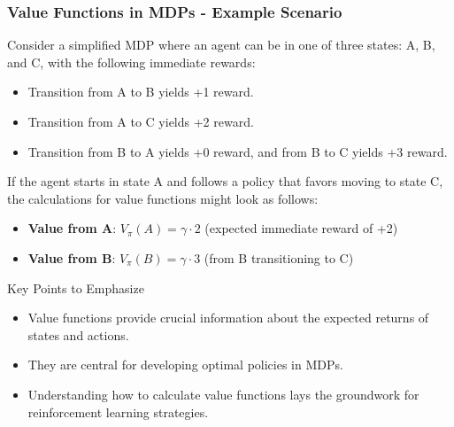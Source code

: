 \documentclass[aspectratio=169]{beamer}
\begin{document}
\begin{frame}[fragile]
    \frametitle{Value Functions in MDPs - Example Scenario}

    Consider a simplified MDP where an agent can be in one of three states: A, B, and C, with the following immediate rewards:
    
    \begin{itemize}
        \item Transition from A to B yields +1 reward.
        \item Transition from A to C yields +2 reward.
        \item Transition from B to A yields +0 reward, and from B to C yields +3 reward.
    \end{itemize}
    
    If the agent starts in state A and follows a policy that favors moving to state C, the calculations for value functions might look as follows:
    \begin{itemize}
        \item \textbf{Value from A}: $ V_{\pi}(A) = \gamma \cdot 2$ (expected immediate reward of +2)
        \item \textbf{Value from B}: $ V_{\pi}(B) = \gamma \cdot 3$ (from B transitioning to C)
    \end{itemize}

    \begin{block}{Key Points to Emphasize}
        \begin{itemize}
            \item Value functions provide crucial information about the expected returns of states and actions.
            \item They are central for developing optimal policies in MDPs.
            \item Understanding how to calculate value functions lays the groundwork for reinforcement learning strategies.
        \end{itemize}
    \end{block}
\end{frame}
\end{document}
